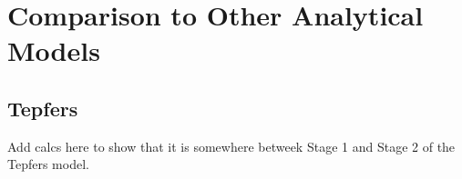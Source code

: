 \chapter{Comparison to Other Analytical Models}

\section{Tepfers}

Add calcs here to show that it is somewhere betweek Stage 1 and Stage 2 of the Tepfers model.